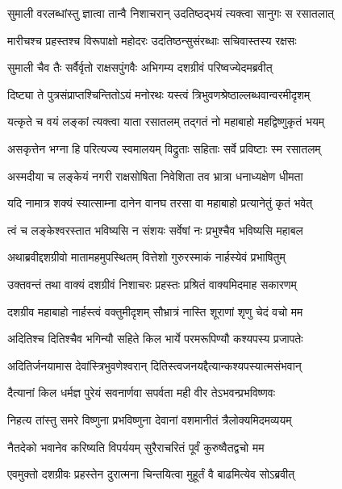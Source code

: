 \twolineshloka
{सुमाली वरलब्धांस्तु ज्ञात्वा तान्वै निशाचरान्}
{उदतिष्ठद्भयं त्यक्त्वा सानुगः स रसातलात्} %

\twolineshloka
{मारीचश्च प्रहस्तश्च विरूपाक्षो महोदरः}
{उदतिष्ठन्सुसंरब्धाः सचिवास्तस्य रक्षसः} %

\twolineshloka
{सुमाली चैव तैः सर्वैर्वृतो राक्षसपुंगवैः}
{अभिगम्य दशग्रीवं परिष्वज्येदमब्रवीत्} %

\twolineshloka
{दिष्ट्या ते पुत्रसंप्राप्तश्चिन्तितोऽयं मनोरथः}
{यस्त्वं त्रिभुवणश्रेष्ठाल्लब्धवान्वरमीदृशम्} %

\twolineshloka
{यत्कृते च वयं लङ्कां त्यक्त्वा याता रसातलम्}
{तद्गतं नो महाबाहो महद्विष्णुकृतं भयम्} %

\twolineshloka
{असकृत्तेन भग्ना हि परित्यज्य स्वमालयम्}
{विद्रुताः सहिताः सर्वे प्रविष्टाः स्म रसातलम्} %

\twolineshloka
{अस्मदीया च लङ्केयं नगरी राक्षसोषिता}
{निवेशिता तव भ्रात्रा धनाध्यक्षेण धीमता} %

\twolineshloka
{यदि नामात्र शक्यं स्यात्साम्ना दानेन वानघ}
{तरसा वा महाबाहो प्रत्यानेतुं कृतं भवेत्} %

\twolineshloka
{त्वं च लङ्केश्वरस्तात भविष्यसि न संशयः}
{सर्वेषां नः प्रभुश्चैव भविष्यसि महाबल} %

\twolineshloka
{अथाब्रवीद्दशग्रीवो मातामहमुपस्थितम्}
{वित्तेशो गुरुरस्माकं नार्हस्येवं प्रभाषितुम्} %

\twolineshloka
{उक्तवन्तं तथा वाक्यं दशग्रीवं निशाचरः}
{प्रहस्तः प्रश्रितं वाक्यमिदमाह सकारणम्} %

\twolineshloka
{दशग्रीव महाबाहो नार्हस्त्वं वक्तुमीदृशम्}
{सौभ्रात्रं नास्ति शूराणां शृणु चेदं वचो मम} %

\twolineshloka
{अदितिश्च दितिश्चैव भगिन्यौ सहिते किल}
{भार्ये परमरूपिण्यौ कश्यपस्य प्रजापतेः} %

\twolineshloka
{अदितिर्जनयामास देवांस्त्रिभुवणेश्वरान्}
{दितिस्त्वजनयद्दैत्यान्कश्यपस्यात्मसंभवान्} %

\twolineshloka
{दैत्यानां किल धर्मज्ञ पुरेयं सवनार्णवा}
{सपर्वता मही वीर तेऽभवन्प्रभविष्णवः} %

\twolineshloka
{निहत्य तांस्तु समरे विष्णुना प्रभविष्णुना}
{देवानां वशमानीतं त्रैलोक्यमिदमव्ययम्} %

\twolineshloka
{नैतदेको भवानेव करिष्यति विपर्ययम्}
{सुरैराचरितं पूर्वं कुरुष्वैतद्वचो मम} %

\twolineshloka
{एवमुक्तो दशग्रीवः प्रहस्तेन दुरात्मना}
{चिन्तयित्वा मुहूर्तं वै बाढमित्येव सोऽब्रवीत्} %

